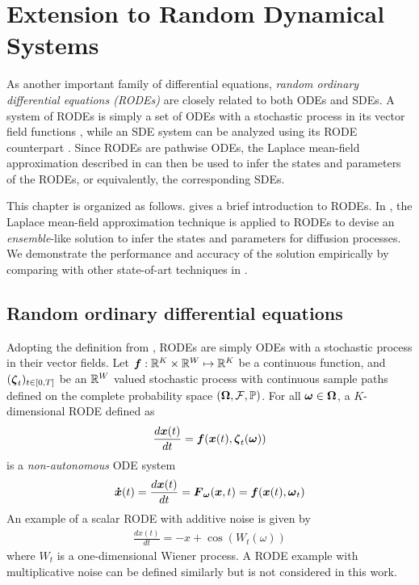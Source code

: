 \chapter{Extension to Random Dynamical Systems}
\label{ch-rodes}

As another important family of differential equations, \emph{random ordinary differential equations (RODEs)} are closely related to both ODEs and SDEs.
A system of RODEs is simply a set of ODEs with a stochastic process in its vector field functions \citep{kloeden2007pathwise}, while an SDE system can be analyzed using its RODE counterpart \citep{sussmann1978gap, imkeller2001conjugacy}.
Since RODEs are pathwise ODEs, the Laplace mean-field approximation described in  can then be used to infer the states and parameters of the RODEs, or equivalently, the corresponding SDEs.

This chapter is organized as follows.
 gives a brief introduction to RODEs.
In , the Laplace mean-field approximation technique is applied to RODEs to devise an \emph{ensemble}-like \citep[]{murphy2012machine} solution to infer the states and parameters for diffusion processes.
We demonstrate the performance and accuracy of the solution empirically by comparing with other state-of-art techniques in .

\section{Random ordinary differential equations}
\label{sec-rodes}

Adopting the definition from \cite{kloeden2007pathwise}, RODEs are simply ODEs with a stochastic process in their vector fields.
Let $\boldsymbol{f}: \mathbb{R}^K\times\mathbb{R}^W\mapsto\mathbb{R}^K$ be a continuous function, and $(\boldsymbol{\zeta}_t)_{t\in [0,T]}$ be an $\mathbb{R}^W$ valued stochastic process with continuous sample paths defined on the complete probability space $(\boldsymbol{\Omega}, \mathcal{F}, \mathbb{P})$.  
For all $\boldsymbol{\omega} \in \boldsymbol{\Omega}$, a $K$-dimensional RODE defined as
\begin{align}
    \frac{d\boldsymbol{x}(t)}{dt} = \boldsymbol{f}(\boldsymbol{x}(t), \boldsymbol{\zeta}_t(\boldsymbol{\omega}))
    \label{eq-rodes}
\end{align}
is a \emph{non-autonomous} ODE system
\begin{align}
    \boldsymbol{\dot{x}}(t) = \frac{d\boldsymbol{x}(t)}{dt} = \boldsymbol{F}_{\boldsymbol{\omega}}(\boldsymbol{x}, t) = \boldsymbol{f}(\boldsymbol{x}(t), \boldsymbol{\omega}_t)
    \label{eq-rodes-odes}
\end{align}
An example \citep{grune2001pathwise} of a scalar RODE with additive noise is given by
\begin{align}
    \frac{dx(t)}{dt} = -x + \cos{(W_t(\omega))}
    \label{eq-rodes-example}
\end{align}
where $W_t$ is a one-dimensional Wiener process.
A RODE example with multiplicative noise can be defined similarly but is not considered in this work.

